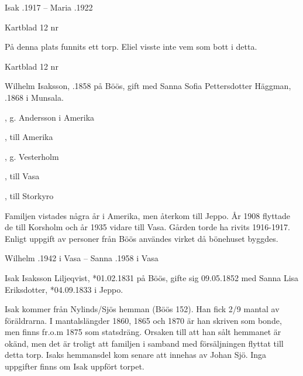Isak .1917  --  Maria .1922


Kartblad 12   nr 

På denna plats funnits ett torp. Eliel visste inte vem som bott i detta.


Kartblad 12   nr 

Wilhelm Isaksson, .1858 på Böös, gift med Sanna Sofia Pettersdotter Häggman, .1868 i Munsala.
\begin{jhchildren}
  \item {}, g. Andersson i Amerika
  \item {}, till Amerika
  \item {}
  \item {}, g. Vesterholm
  \item {}, till Vasa
  \item {}, till Storkyro
\end{jhchildren}
Familjen vistades några år i Amerika, men återkom till Jeppo. År 1908 flyttade de till Korsholm och år 1935 vidare till Vasa. Gården torde ha rivits 1916-1917. Enligt uppgift av personer från Böös användes virket då bönehuset byggdes.

Wilhelm .1942 i Vasa  --  Sanna .1958 i Vasa


		Isak Isaksson Liljeqvist,  *01.02.1831 på Böös, gifte sig 09.05.1852
		med Sanna Lisa Eriksdotter,  *04.09.1833 i Jeppo.
    \begin{jhchildren}
      \item {}
      \item {}
      \item {}
      \item {}
      \item {}
      \item {}
      \item {}
      \item {}
      \item {}
      \item {}
    \end{jhchildren}
Isak kommer från Nylinds/Sjös hemman (Böös 152). Han fick 2/9 mantal av föräldrarna. I mantalslängder 1860, 1865 och 1870 är han skriven som bonde, men finns fr.o.m 1875 som statsdräng. Orsaken till att han sålt hemmanet är okänd, men det är troligt att familjen i samband med försäljningen flyttat till detta torp. Isaks hemmansdel kom senare att innehas av Johan Sjö. Inga uppgifter finns om Isak uppfört torpet.

